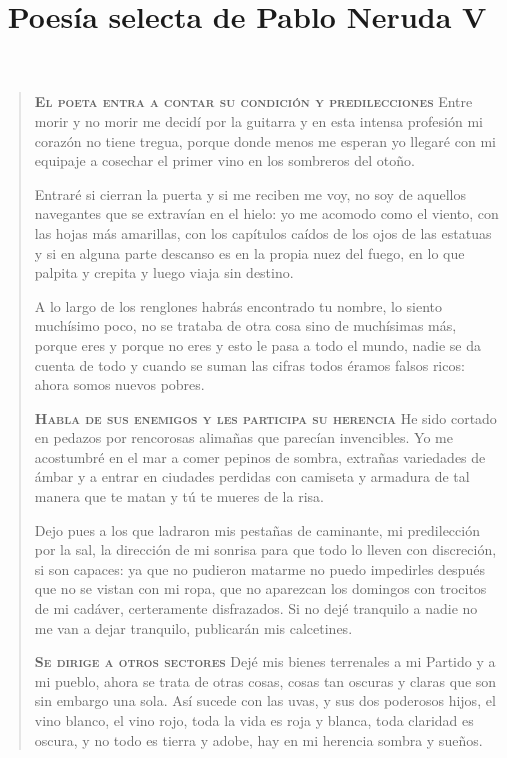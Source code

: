 \documentclass[12pt]{article}
\date{}
\title{Poesía selecta de Pablo Neruda V}
\begin{document}
\maketitle
\tableofcontents

\clearpage
{}
\begin{verse}
\vspace{\baselineskip}
{\scshape\bfseries El poeta entra a contar su condición y predilecciones}
Entre morir y no morir  
me decidí por la guitarra  
y en esta intensa profesión  
mi corazón no tiene tregua,  
porque donde menos me esperan  
yo llegaré con mi equipaje  
a cosechar el primer vino  
en los sombreros del otoño.  

Entraré si cierran la puerta  
y si me reciben me voy,  
no soy de aquellos navegantes  
que se extravían en el hielo:  
yo me acomodo como el viento,  
con las hojas más amarillas,  
con los capítulos caídos  
de los ojos de las estatuas  
y si en alguna parte descanso  
es en la propia nuez del fuego,  
en lo que palpita y crepita  
y luego viaja sin destino.  

A lo largo de los renglones  
habrás encontrado tu nombre,  
lo siento muchísimo poco,  
no se trataba de otra cosa  
sino de muchísimas más,  
porque eres y porque no eres  
y esto le pasa a todo el mundo,  
nadie se da cuenta de todo  
y cuando se suman las cifras  
todos éramos falsos ricos:  
ahora somos nuevos pobres.  

\vspace{\baselineskip}
{\scshape\bfseries Habla de sus enemigos y les participa su herencia}
He sido cortado en pedazos  
por rencorosas alimañas  
que parecían invencibles.  
Yo me acostumbré en el mar  
a comer pepinos de sombra,  
extrañas variedades de ámbar  
y a entrar en ciudades perdidas  
con camiseta y armadura  
de tal manera que te matan  
y tú te mueres de la risa.  

Dejo pues a los que ladraron  
mis pestañas de caminante,  
mi predilección por la sal,  
la dirección de mi sonrisa  
para que todo lo lleven  
con discreción, si son capaces:  
ya que no pudieron matarme  
no puedo impedirles después  
que no se vistan con mi ropa,  
que no aparezcan los domingos  
con trocitos de mi cadáver,  
certeramente disfrazados.  
Si no dejé tranquilo a nadie  
no me van a dejar tranquilo,  
publicarán mis calcetines.  

\vspace{\baselineskip}
{\scshape\bfseries Se dirige a otros sectores}
Dejé mis bienes terrenales  
a mi Partido y a mi pueblo,  
ahora se trata de otras cosas,  
cosas tan oscuras y claras  
que son sin embargo una sola.  
Así sucede con las uvas,  
y sus dos poderosos hijos,  
el vino blanco, el vino rojo,  
toda la vida es roja y blanca,  
toda claridad es oscura,  
y no todo es tierra y adobe,  
hay en mi herencia sombra y sueños.  


\end{verse}
\end{document}

